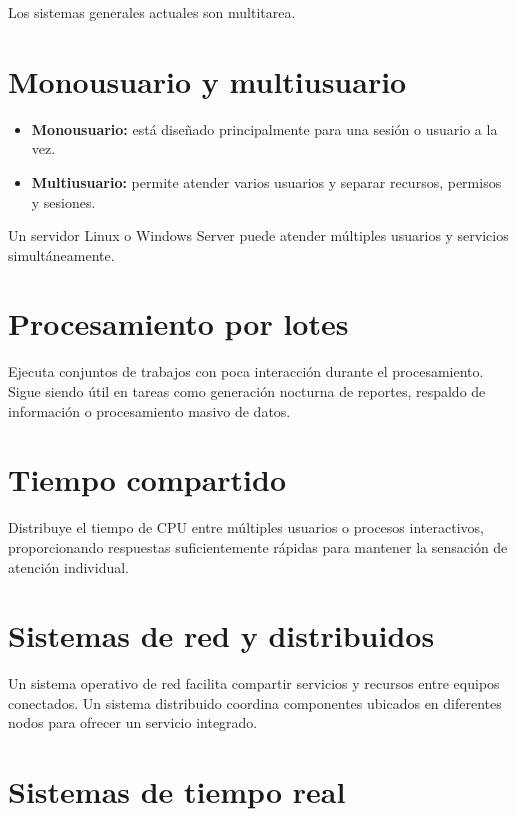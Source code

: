 \documentclass[
  spanish,
  letterpaper,
]{scrbook}
\providecommand{\tightlist}{%
  \setlength{\itemsep}{0pt}\setlength{\parskip}{0pt}}
\begin{document}
Los sistemas generales actuales son multitarea.

\section{Monousuario y multiusuario}\label{monousuario-y-multiusuario}

\begin{itemize}
\tightlist
\item
  \textbf{Monousuario:} está diseñado principalmente para una sesión o
  usuario a la vez.
\item
  \textbf{Multiusuario:} permite atender varios usuarios y separar
  recursos, permisos y sesiones.
\end{itemize}

Un servidor Linux o Windows Server puede atender múltiples usuarios y
servicios simultáneamente.

\section{Procesamiento por lotes}\label{procesamiento-por-lotes-1}

Ejecuta conjuntos de trabajos con poca interacción durante el
procesamiento. Sigue siendo útil en tareas como generación nocturna de
reportes, respaldo de información o procesamiento masivo de datos.

\section{Tiempo compartido}\label{tiempo-compartido}

Distribuye el tiempo de CPU entre múltiples usuarios o procesos
interactivos, proporcionando respuestas suficientemente rápidas para
mantener la sensación de atención individual.

\section{Sistemas de red y
distribuidos}\label{sistemas-de-red-y-distribuidos}

Un sistema operativo de red facilita compartir servicios y recursos
entre equipos conectados. Un sistema distribuido coordina componentes
ubicados en diferentes nodos para ofrecer un servicio integrado.

\section{Sistemas de tiempo real}\label{sistemas-de-tiempo-real}
\end{document}
